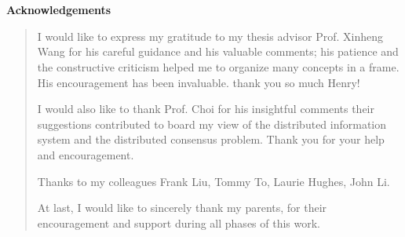 
\chapter*{ }

\newenvironment{acknowledgements} {\pagestyle{empty}   \begin{center} 
{\Large \bfseries Acknowledgements} \end{center} 
\begin{quote}} {\end{quote} }

\begin{acknowledgements} 



\begin{doublespace}
 







I would like to express my gratitude to my thesis advisor Prof. Xinheng
Wang for his careful guidance and his valuable comments; his patience
and the constructive criticism helped me to organize many concepts
in a frame. His encouragement has been invaluable. thank you so much
Henry!

I would also like to thank Prof. Choi for his insightful comments
their suggestions contributed to board my view of the distributed
information system and the distributed consensus problem. Thank you
for your help and encouragement.

 

Thanks to my colleagues Frank Liu, Tommy To, Laurie Hughes, John Li.

 

At last, I would like to sincerely thank my parents, for their encouragement
and support during all phases of this work.
\end{doublespace}

\end{acknowledgements}
